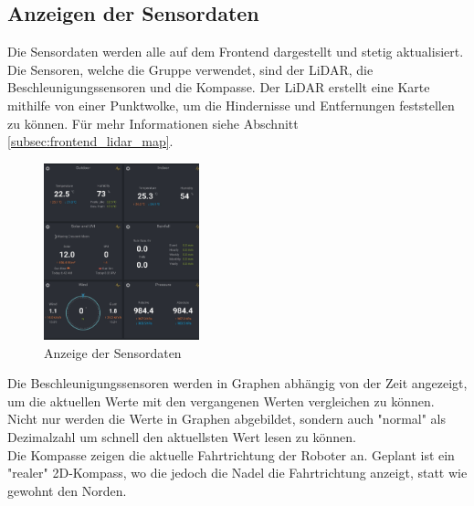 \subsection{Anzeigen der Sensordaten}
\label{subsec:frontend_sensors}
Die Sensordaten werden alle auf dem Frontend dargestellt und stetig aktualisiert. Die Sensoren, welche die Gruppe verwendet, sind der LiDAR, die Beschleunigungssensoren und die Kompasse.
Der LiDAR erstellt eine Karte mithilfe von einer Punktwolke, um die Hindernisse und Entfernungen feststellen zu können. Für mehr Informationen siehe Abschnitt \ref{subsec:frontend_lidar_map}.
\begin{figure}[H]
    \includegraphics[width=0.4\textwidth, center]{img/Sensor_Anzeige_LOESCHEN.png}
    \caption{Anzeige der Sensordaten}
    \label{fig:Sensordaten}
\end{figure}
Die Beschleunigungssensoren werden in Graphen abhängig von der Zeit angezeigt, um die aktuellen Werte mit den vergangenen Werten vergleichen zu können. Nicht nur werden die Werte in Graphen abgebildet, sondern auch "normal" als Dezimalzahl
um schnell den aktuellsten Wert lesen zu können.
\\
Die Kompasse zeigen die aktuelle Fahrtrichtung der Roboter an. Geplant ist ein "realer" 2D-Kompass, wo die jedoch die Nadel die Fahrtrichtung anzeigt, statt wie gewohnt den Norden.